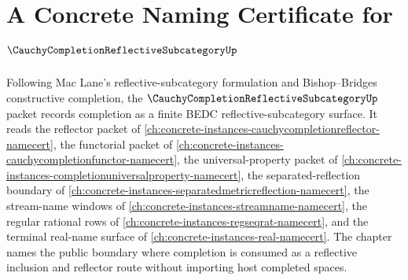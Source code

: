 \chapter{A Concrete Naming Certificate for $\CauchyCompletionReflectiveSubcategoryUp$}
\label{ch:concrete-instances-cauchy-completion-reflective-subcategory-namecert}

Following Mac Lane's reflective-subcategory formulation and Bishop--Bridges constructive completion, the $\CauchyCompletionReflectiveSubcategoryUp$ packet records completion as a finite BEDC reflective-subcategory surface. It reads the reflector packet of \autoref{ch:concrete-instances-cauchycompletionreflector-namecert}, the functorial packet of \autoref{ch:concrete-instances-cauchycompletionfunctor-namecert}, the universal-property packet of \autoref{ch:concrete-instances-completionuniversalproperty-namecert}, the separated-reflection boundary of \autoref{ch:concrete-instances-separatedmetricreflection-namecert}, the stream-name windows of \autoref{ch:concrete-instances-streamname-namecert}, the regular rational rows of \autoref{ch:concrete-instances-regseqrat-namecert}, and the terminal real-name surface of \autoref{ch:concrete-instances-real-namecert}. The chapter names the public boundary where completion is consumed as a reflective inclusion and reflector route without importing host completed spaces.

